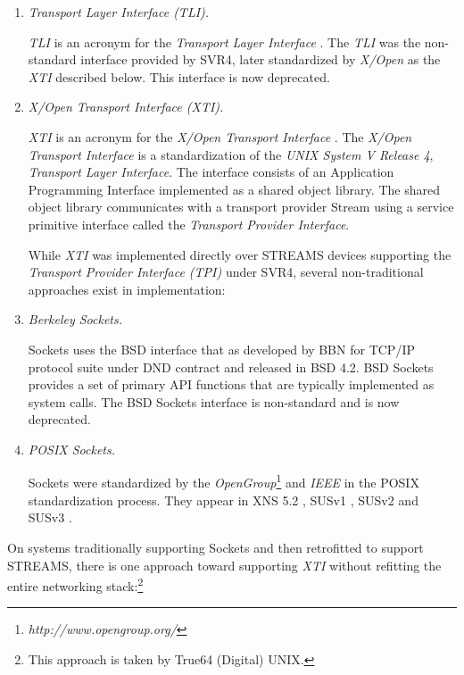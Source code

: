 \documentclass[letterpaper,final,notitlepage,twocolumn,10pt,twoside]{article}
\begin{document}
\begin{enumerate}

\item {\it Transport Layer Interface (TLI).}

\textsl{TLI} is an acronym for the \textit{Transport Layer Interface}
\cite[]{tli}.  The \textsl{TLI} was the non-standard interface provided by
SVR4, later standardized by \textit{X/Open} as the \textsl{XTI} described
below.  This interface is now deprecated.

\item {\it X/Open Transport Interface (XTI).}

\textsl{XTI} is an acronym for the \textsl{X/Open Transport Interface}
\cite[]{xti}.  The \textsl{X/Open Transport Interface} is a standardization of
the \textsl{UNIX System V Release 4}, \textsl{Transport Layer Interface}.  The
interface consists of an Application Programming Interface implemented as a
shared object library.  The shared object library communicates with a
transport provider Stream using a service primitive interface called the
\textsl{Transport Provider Interface}.

While \textsl{XTI} was implemented directly over STREAMS devices supporting
the \textit{Transport Provider Interface (TPI)} \cite[]{tpi} under SVR4,
several non-traditional approaches exist in implementation:

\item {\it Berkeley Sockets.}

Sockets uses the BSD interface that as developed by BBN for TCP/IP protocol
suite under DND contract and released in BSD 4.2.  BSD Sockets provides a set
of primary API functions that are typically implemented as system calls.  The
BSD Sockets interface is non-standard and is now deprecated.

\item {\it POSIX Sockets.}

Sockets were standardized by the \textit{OpenGroup}\footnote{\it
http://www.opengroup.org/} and \textit{IEEE} in the POSIX standardization
process.  They appear in XNS 5.2 \cite[]{xns}, SUSv1 \cite[]{susv1}, SUSv2
\cite[]{susv2} and SUSv3 \cite[]{susv3}.

\end{enumerate}

On systems traditionally supporting Sockets and then retrofitted to support
STREAMS, there is one approach toward supporting \textsl{XTI} without
refitting the entire networking stack:\footnote{This approach is taken by
True64 (Digital) UNIX.}
\end{document}
